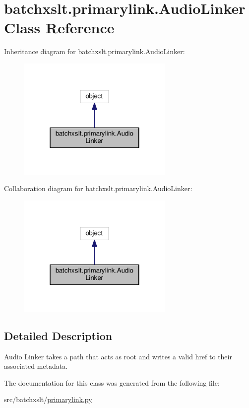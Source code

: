 \hypertarget{classbatchxslt_1_1primarylink_1_1_audio_linker}{}\section{batchxslt.\+primarylink.\+Audio\+Linker Class Reference}
\label{classbatchxslt_1_1primarylink_1_1_audio_linker}


Inheritance diagram for batchxslt.\+primarylink.\+Audio\+Linker\+:
\nopagebreak
\begin{figure}[H]
\begin{center}
\leavevmode
\includegraphics[width=214pt]{de/da5/classbatchxslt_1_1primarylink_1_1_audio_linker__inherit__graph}
\end{center}
\end{figure}


Collaboration diagram for batchxslt.\+primarylink.\+Audio\+Linker\+:
\nopagebreak
\begin{figure}[H]
\begin{center}
\leavevmode
\includegraphics[width=214pt]{d7/da5/classbatchxslt_1_1primarylink_1_1_audio_linker__coll__graph}
\end{center}
\end{figure}


\subsection{Detailed Description}
\begin{DoxyVerb}Audio Linker takes a path that acts as root and writes
a valid href to their associated metadata.
\end{DoxyVerb}
 

The documentation for this class was generated from the following file\+:\begin{DoxyCompactItemize}
\item 
src/batchxslt/\hyperlink{primarylink_8py}{primarylink.\+py}\end{DoxyCompactItemize}
